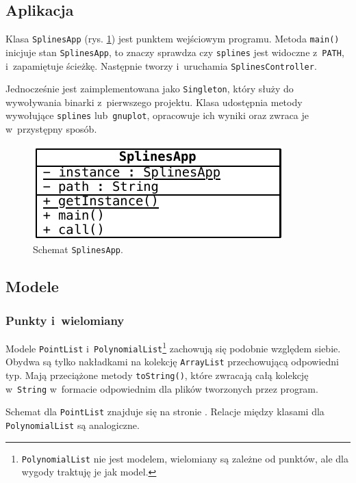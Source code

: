 \documentclass[10pt,a4paper]{article}
\newcommand{\f}[1]{\texttt{#1}}
\begin{document}
\subsection{Aplikacja}

Klasa \f{SplinesApp} (rys. \ref{fig:aplikacja-szczegolowo}) jest punktem
wejściowym programu. Metoda \f{main()} inicjuje stan \f{SplinesApp}, to znaczy
sprawdza czy \f{splines} jest widoczne z~\f{PATH}, i~zapamiętuje ścieżkę.
Następnie tworzy i~uruchamia \f{SplinesController}.

Jednocześnie jest zaimplementowana jako \f{Singleton}, który służy do
wywoływania binarki z~pierwszego projektu. Klasa udostępnia metody wywołujące
\f{splines} lub~\f{gnuplot}, opracowuje ich wyniki oraz zwraca je w~przystępny
sposób.

\begin{figure}[hb]
  \centering
  \includegraphics{figury/aplikacja-szczegolowo}
  \caption{Schemat \f{SplinesApp}.}
  \label{fig:aplikacja-szczegolowo}
\end{figure}

\subsection{Modele}

\subsubsection{Punkty i~wielomiany}

Modele \f{PointList} i~\f{PolynomialList}\footnote{\f{PolynomialList} nie jest
modelem, wielomiany są zależne od punktów, ale dla wygody traktuję je jak
model.} zachowują się podobnie względem siebie. Obydwa są tylko nakładkami na
kolekcję \f{ArrayList} przechowującą odpowiedni typ. Mają przeciążone metody
\f{toString()}, które zwracają całą kolekcję w~\f{String} w~formacie
odpowiednim dla plików tworzonych przez program.

Schemat dla \f{PointList} znajduje się na stronie
\pageref{fig:punkty-szczegolowo}. Relacje między klasami dla \f{PolynomialList}
są analogiczne.
\end{document}
